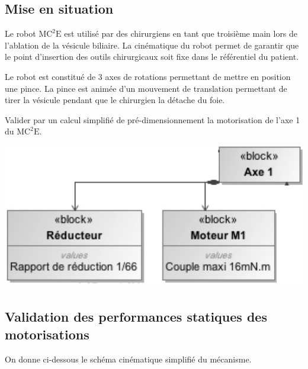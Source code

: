 \documentclass[10pt,fleqn]{article} %
\begin{document}

\vspace{4.5cm}
\pagestyle{fancy}
\thispagestyle{plain}


\def\columnseprulecolor{\color{ocre}}
\setlength{\columnseprule}{0.4pt} 

\ifprof
\else
\begin{multicols}{2}
\fi
\section*{Mise en situation}
\ifprof
\else
Le robot $\text{MC}^2\text{E}$ est utilisé par des chirurgiens en tant que troisième main lors de l'ablation de la vésicule biliaire. La cinématique du robot permet de garantir que le point d'insertion des outils chirurgicaux soit fixe dans le référentiel du patient. 

Le robot est constitué de 3 axes de rotations permettant de mettre en position une pince. La pince est animée d'un mouvement de translation permettant de tirer la vésicule pendant que le chirurgien la détache du foie. 


\begin{obj}
Valider par un calcul simplifié de pré-dimensionnement la motorisation de l'axe 1 du  $\text{MC}^2\text{E}$.

\end{obj}


\begin{center}
\includegraphics[width=\linewidth]{images/fig_04}
\end{center}

\subsection*{Validation des performances statiques des motorisations}
On donne ci-dessous le schéma cinématique simplifié du mécanisme.


\end{multicols}
\end{document}
